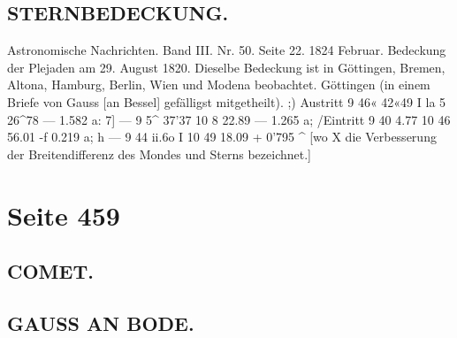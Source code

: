\documentclass[10pt,a4paper]{article}
\begin{document}
\subsection*{STERNBEDECKUNG.}

Astronomische  Nachrichten.     Band  III.   Nr.  50.  Seite  22.     1824  Februar.
Bedeckung  der  Plejaden  am  29.  August  1820.
Dieselbe  Bedeckung  ist  in  Göttingen,  Bremen,   Altona,  Hamburg,   Berlin,   Wien   und    Modena
beobachtet.
Göttingen  (in  einem  Briefe  von  Gauss  [an  Bessel]  gefälligst  mitgetheilt).
;)  Austritt  9\glqq{}  46«  42«49  I     la\glqq{}     5\glqq{}\glqq{}  26\textasciicircum{}78  ---  1.582  a:
7]       ---  9  5\textasciicircum{}  37'37  10       8     22.89  ---  1.265  a;
/Eintritt  9  40  4.77  10    46     56.01 -f  0.219  a;
h       ---  9  44  ii.6o  I     10     49     18.09  +  0'795  \textasciicircum{}
[wo  X  die  Verbesserung  der  Breitendifferenz  des  Mondes  und  Sterns  bezeichnet.]

\newpage
\section*{Seite 459}

\subsection*{COMET.}

\subsection*{GAUSS  AN  BODE.}
\end{document}

